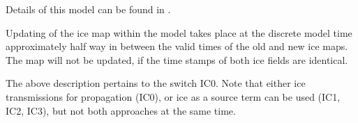 \noindent
Details of this model can be found in \cite{tol:OMOD03a}.

Updating of the ice map within the model takes place at the discrete model
time approximately half way in between the valid times of the old and new ice
maps. The map will not be updated, if the time stamps of both ice fields are
identical.

The above description pertains to the switch {\code IC0}. Note that either ice transmissions for propagation ({\code IC0}), or ice as a source term can be used ({\code IC1}, {\code IC2}, {\code IC3}), but not both approaches at the same time.
